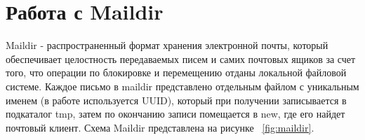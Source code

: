 \documentclass[a4paper,12pt]{report}
\begin{document}




\section{Работа с Maildir}

Maildir - распространенный формат хранения электронной почты, который обеспечивает целостность передаваемых писем и самих почтовых ящиков за счет того, что операции по блокировке и перемещению отданы локальной файловой системе. Каждое письмо в maildir представлено отдельным файлом с уникальным именем (в работе используется UUID), который при получении записывается в подкаталог tmp, затем по окончанию записи помещается в new, где его найдет почтовый клиент. Схема Maildir представлена на рисунке ~\ref{fig:maildir}.
\end{document}
